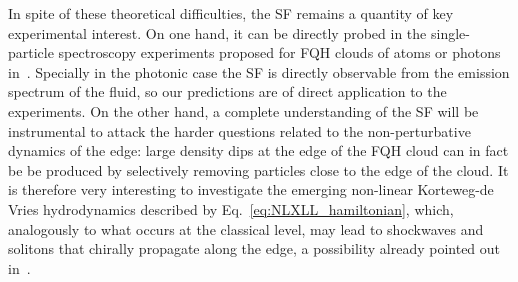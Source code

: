 \documentclass[twocolumn,pra,superscriptaddress,noshowpacs]{revtex4}
\begin{document}
In spite of these theoretical difficulties, the SF remains a quantity of key experimental interest. On one hand, it can be directly probed in the single-particle spectroscopy experiments proposed for FQH clouds of atoms or photons in~\cite{CooperSimon_PRL_2015,Umucalilar_PRA_2017}. Specially in the photonic case the SF is directly observable from the emission spectrum of the fluid, so our predictions are of direct application to the experiments.
On the other hand, a complete understanding of the SF will be instrumental to attack the harder questions related to the non-perturbative dynamics of the edge: large density dips at the edge of the FQH cloud can in fact be be produced by selectively removing particles close to the edge of the cloud. It is therefore very interesting to investigate the emerging non-linear Korteweg-de Vries hydrodynamics described by Eq.~\eqref{eq:NLXLL_hamiltonian}, which, analogously to what occurs at the classical level, may lead to shockwaves and solitons that chirally propagate  along the edge, a possibility already pointed out in~\cite{Bettelheim_PRL_2006,Wiegmann_PRL_2012}.
\end{document}
